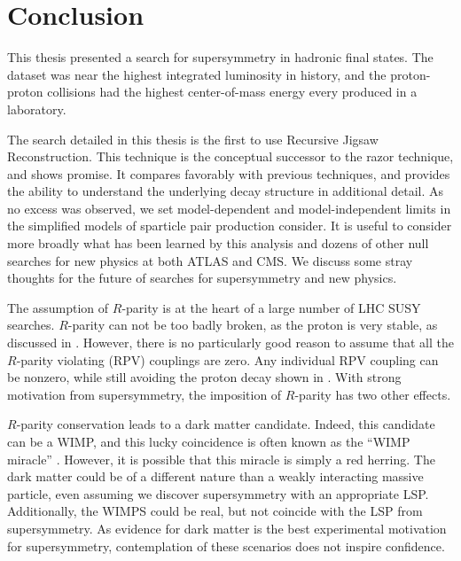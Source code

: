 
\chapter[Conclusion][Conclusion]{Conclusion} %

This thesis presented a search for supersymmetry in hadronic final states.
The dataset was near the highest integrated luminosity in history, and the proton-proton collisions had the highest center-of-mass energy every produced in a laboratory.

The search detailed in this thesis is the first to use Recursive Jigsaw Reconstruction.
This technique is the conceptual successor to the razor technique, and shows promise.
It compares favorably with previous techniques, and provides the ability to understand the underlying decay structure in additional detail.
As no excess was observed, we set model-dependent and model-independent limits in the simplified models of sparticle pair production consider.
It is useful to consider more broadly what has been learned by this analysis and dozens of other null searches for new physics at both ATLAS and CMS.
We discuss some stray thoughts for the future of searches for supersymmetry and new physics.

The assumption of $R$-parity is at the heart of a large number of LHC SUSY searches.
$R$-parity can not be too badly broken, as the proton is very stable, as discussed in .
However, there is no particularly good reason to assume that all the $R$-parity violating (RPV) couplings are zero.
Any individual RPV coupling can be nonzero, while still avoiding the proton decay shown in .
With strong motivation from supersymmetry, the imposition of $R$-parity has two other effects.

$R$-parity conservation leads to a dark matter candidate.
Indeed, this candidate can be a WIMP, and this lucky coincidence is often known as the ``WIMP miracle'' \cite{darkMatterPrimer}.
However, it is possible that this miracle is simply a red herring.
The dark matter could be of a different nature than a weakly interacting massive particle, even assuming we discover supersymmetry with an appropriate LSP.
Additionally, the WIMPS could be real, but not coincide with the LSP from supersymmetry.
As evidence for dark matter is the best experimental motivation for supersymmetry, contemplation of these scenarios does not inspire confidence.

